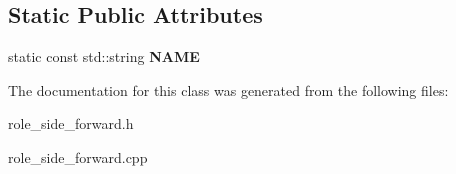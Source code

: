 \subsection*{Static Public Attributes}
\begin{DoxyCompactItemize}
\item 
\hypertarget{classRoleSideForward_a2c662aa46ddf8755f13c0ba9306726b0}{
static const std::string {\bfseries NAME}}
\label{classRoleSideForward_a2c662aa46ddf8755f13c0ba9306726b0}

\end{DoxyCompactItemize}


The documentation for this class was generated from the following files:\begin{DoxyCompactItemize}
\item 
role\_\-side\_\-forward.h\item 
role\_\-side\_\-forward.cpp\end{DoxyCompactItemize}
